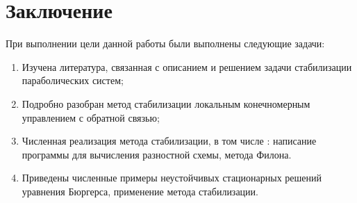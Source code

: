 \section*{Заключение}

\vspace{1em}

При выполнении цели данной работы были выполнены следующие задачи:
\begin{enumerate}
	\item Изучена литература, связанная с описанием и решением задачи 
        стабилизации параболических систем;
	\item Подробно разобран метод стабилизации локальным конечномерным 
        управлением с обратной связью;
	\item Численная реализация метода стабилизации, в том числе : написание 
        программы для вычисления разностной схемы, метода Филона.
	\item Приведены численные примеры неустойчивых стационарных решений 
        уравнения Бюргерса, применение метода стабилизации.
\end{enumerate}
